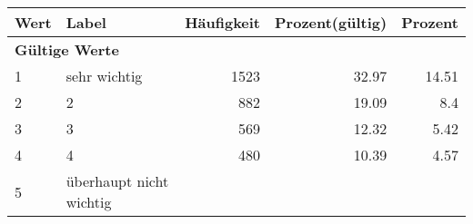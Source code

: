      \begin{longtable}{lXrrr}
     \toprule
     \textbf{Wert} & \textbf{Label} & \textbf{Häufigkeit} & \textbf{Prozent(gültig)} & \textbf{Prozent} \\
     \endhead
     \midrule
     \multicolumn{5}{l}{\textbf{Gültige Werte}}\\

     1 &
     \multicolumn{1}{X}{ sehr wichtig   } &


       \num{1523} &
       \num[round-mode=places,round-precision=2]{32,97} &
         \num[round-mode=places,round-precision=2]{14,51} \\

     2 &
     \multicolumn{1}{X}{ 2   } &


       \num{882} &
       \num[round-mode=places,round-precision=2]{19,09} &
         \num[round-mode=places,round-precision=2]{8,4} \\

     3 &
     \multicolumn{1}{X}{ 3   } &


       \num{569} &
       \num[round-mode=places,round-precision=2]{12,32} &
         \num[round-mode=places,round-precision=2]{5,42} \\

     4 &
     \multicolumn{1}{X}{ 4   } &


       \num{480} &
       \num[round-mode=places,round-precision=2]{10,39} &
         \num[round-mode=places,round-precision=2]{4,57} \\

     5 &
     \multicolumn{1}{X}{ überhaupt nicht wichtig   } &



\end{longtable}
